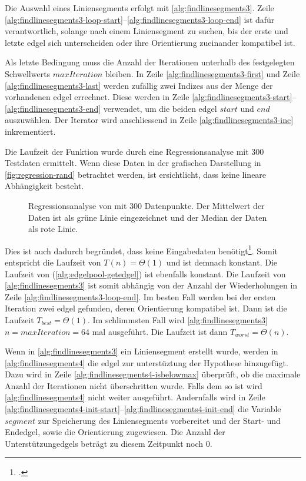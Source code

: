 Die Auswahl eines Liniensegments erfolgt mit \autoref{alg:findlinesegments3}. Zeile
 \ref{alg:findlinesegments3-loop-start}--\ref{alg:findlinesegments3-loop-end} ist dafür verantwortlich, solange nach
 einem Liniensegment zu suchen, bis der erste und letzte \gls{edgel} sich unterscheiden oder ihre Orientierung
 zueinander kompatibel ist.

Als letzte Bedingung muss die Anzahl der Iterationen unterhalb des festgelegten Schwellwerts $\mathit{maxIteration}$
 bleiben. In Zeile \ref{alg:findlinesegments3-first} und Zeile \ref{alg:findlinesegments3-last} werden zufällig zwei
 Indizes aus der Menge der vorhandenen \gls{edgel} errechnet. Diese werden in Zeile
 \ref{alg:findlinesegments3-start}--\ref{alg:findlinesegments3-end} verwendet, um die beiden \gls{edgel}
 $\mathit{start}$ und $\mathit{end}$ auszuwählen. Der Iterator wird anschliessend in Zeile
 \ref{alg:findlinesegments3-inc} inkrementiert.

Die Laufzeit der Funktion  wurde durch eine Regressionsanalyse mit $300$ Testdaten ermittelt. Wenn diese
 Daten in der grafischen Darstellung in \autoref{fig:regression-rand} betrachtet werden, ist ersichtlicht, dass keine
 lineare Abhängigkeit besteht.
\begin{figure}[!ht]
	\centering
	
	\caption{Regressionsanalyse von  mit $300$ Datenpunkte. Der Mittelwert der Daten ist als grüne Linie
	 eingezeichnet und der Median der Daten als rote Linie.}
	\label{fig:regression-rand}
\end{figure}
Dies ist auch dadurch begründet, dass  keine Eingabedaten benötigt\footcite[Vgl.][]{rand}. Somit
 entspricht die Laufzeit von  $T(n) = \Theta(1)$ und ist demnach konstant. Die Laufzeit von
  (\autoref{alg:edgelpool-getedgel}) ist ebenfalls konstant. Die Laufzeit von
 \autoref{alg:findlinesegments3} ist somit abhängig von der Anzahl der Wiederholungen in Zeile
 \ref{alg:findlinesegments3-loop-end}. Im besten Fall werden bei der ersten Iteration zwei \gls{edgel} gefunden, deren
 Orientierung kompatibel ist. Dann ist die Laufzeit $T_{best} = \Theta(1)$. Im schlimmsten Fall wird
 \autoref{alg:findlinesegments3} $n = \mathit{maxIteration} = 64$ mal ausgeführt. Die Laufzeit ist dann
 $T_{worst} = \Theta(n)$.

Wenn in \autoref{alg:findlinesegments3} ein Liniensegment erstellt wurde, werden in \autoref{alg:findlinesegments4} die
 \gls{edgel} zur unterstüztung der Hypothese hinzugefügt. Dazu wird in Zeile \ref{alg:findlinesegments4-isbelowmax}
 überprüft, ob die maximale Anzahl der Iterationen nicht überschritten wurde. Falls dem so ist wird
 \autoref{alg:findlinesegments4} nicht weiter ausgeführt. Andernfalls wird in Zeile
 \ref{alg:findlinesegments4-init-start}--\ref{alg:findlinesegments4-init-end} die Variable $\mathit{segment}$ zur
 Speicherung des Liniensegments vorbereitet und der Start- und Endedgel, sowie die Orientierung zugewiesen. Die Anzahl
 der Unterstützungedgels beträgt zu diesem Zeitpunkt noch $0$.

